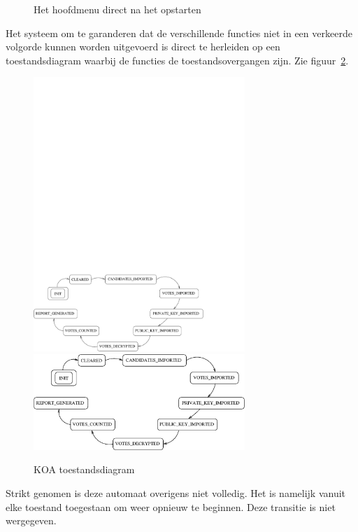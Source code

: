\documentclass{article}
\begin{document}
\begin{figure}[htb]
\begin{center}
    \fi
    \caption{Het hoofdmenu direct na het opstarten}
    \label{fig:gui}
  \end{center}
\end{figure}
Het systeem om te garanderen dat de verschillende functies niet in een 
verkeerde volgorde kunnen worden uitgevoerd is direct te herleiden op
een toestandsdiagram waarbij de functies de toestandsovergangen zijn.
Zie figuur~\ref{fig:toestanden}.
\begin{figure}[htbp]
  \begin{center}
    \ifpdf
    \includegraphics[width=80mm]{koa_state_diagram}
    \else
    \includegraphics[width=80mm]{koa_state_diagram.eps}
    \fi
    \caption{KOA toestandsdiagram}
    \label{fig:toestanden}
  \end{center}
\end{figure}
Strikt genomen is deze automaat overigens niet volledig. Het is namelijk vanuit elke toestand toegestaan om weer opnieuw te beginnen. Deze transitie is niet wergegeven.
\end{document}
